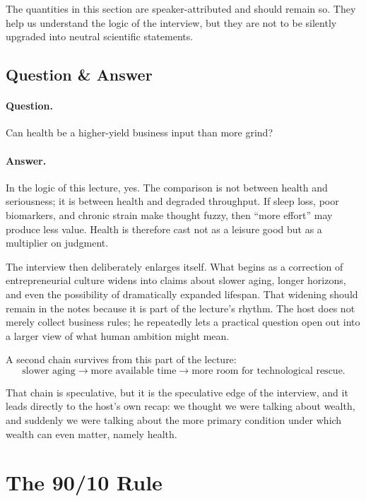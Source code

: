 \begin{remark}
The quantities in this section are speaker-attributed and should remain so. They help us understand the logic of the interview, but they are not to be silently upgraded into neutral scientific statements.
\end{remark}

\subsection{Question \& Answer}

\paragraph{Question.} Can health be a higher-yield business input than more grind?

\paragraph{Answer.} In the logic of this lecture, yes. The comparison is not between health and seriousness; it is between health and degraded throughput. If sleep loss, poor biomarkers, and chronic strain make thought fuzzy, then ``more effort'' may produce less value. Health is therefore cast not as a leisure good but as a multiplier on judgment.

The interview then deliberately enlarges itself. What begins as a correction of entrepreneurial culture widens into claims about slower aging, longer horizons, and even the possibility of dramatically expanded lifespan. That widening should remain in the notes because it is part of the lecture's rhythm. The host does not merely collect business rules; he repeatedly lets a practical question open out into a larger view of what human ambition might mean.

A second chain survives from this part of the lecture:
\begin{equation}
\text{slower aging}
\to
\text{more available time}
\to
\text{more room for technological rescue}.
\end{equation}

That chain is speculative, but it is the speculative edge of the interview, and it leads directly to the host's own recap: we thought we were talking about wealth, and suddenly we were talking about the more primary condition under which wealth can even matter, namely health.

\section{The 90/10 Rule}

